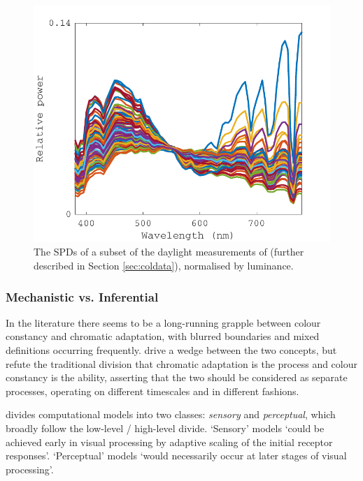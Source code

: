 \begin{figure}[htbp]
\includegraphics[max width=\textwidth]{figs/LitRev/ColorimetryDemo7.pdf}
\caption{The \glspl{SPD} of a subset of the daylight measurements of \citet{hernandez-andres_color_2001} (further described in Section \ref{sec:coldata}), normalised by luminance.}
\label{fig:SPDnorm}
\end{figure}

\subsubsection{Mechanistic vs. Inferential}

In the literature there seems to be a long-running grapple between colour constancy and chromatic adaptation, with blurred boundaries and mixed definitions occurring frequently. \citet{brill_chromatic_1986} drive a wedge between the two concepts, but refute the traditional division that chromatic adaptation is the process and colour constancy is the ability, asserting that the two should be considered as separate processes, operating on different timescales and in different fashions.

\citet{hurlbert_computational_1998} divides computational models into two classes: \emph{sensory} and \emph{perceptual}, which broadly follow the low-level / high-level divide. `Sensory' models `could be achieved early in visual processing by adaptive scaling of the initial receptor responses'. `Perceptual' models `would necessarily occur at later stages of visual processing'.


